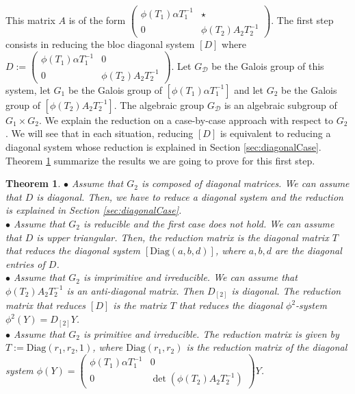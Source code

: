 \documentclass[a4paper,11pt]{amsart}
\newcommand{\Gdiag}{G_{\mathcal{D}}}
\newtheorem{thm}{Theorem}[section]
\begin{document}
This matrix  $A$ is of the form
$\begin{pmatrix}
\phi(T_1)\alpha T_1^{-1}&\star \\ 
0 &\phi(T_2)A_2 T_2^{-1}
\end{pmatrix}$. 
The first step consists in reducing the bloc diagonal system $[D]$ where $D:=\begin{pmatrix}
\phi(T_1)\alpha T_1^{-1}&0 \\ 
0 &\phi(T_2)A_2 T_2^{-1}
\end{pmatrix}$. Let $\Gdiag$ be the Galois group of this system, let $G_1$ be the Galois group of $[\phi(T_1)\alpha T_1^{-1}]$ and let $G_2$ be the Galois group of $[\phi(T_2)A_2 T_2^{-1}]$.  
The algebraic group $\Gdiag$ is an algebraic subgroup of $G_1\times G_2$. We explain the reduction on a case-by-case approach with respect to $G_2$. We will see that in each situation, reducing $[D]$ is equivalent to reducing a diagonal system whose reduction is explained in Section \ref{sec:diagonalCase}. Theorem \ref{thm:reduc_blocdiag} summarize the results we are going to prove for this first step.

  \begin{thm}
  \label{thm:reduc_blocdiag}
$\bullet$ Assume that $G_2$ is composed of diagonal matrices.  We can assume that $D$ is diagonal.  Then, we have to reduce a diagonal system and the reduction is explained in Section \ref{sec:diagonalCase}.\\
$\bullet$  Assume that $G_2$ is reducible and the first case does not hold.  We can assume that $D$ is upper triangular.  Then,   the reduction matrix is the diagonal matrix $T$ that reduces the diagonal  system $[\mathrm{Diag}(a,b,d)]$, where $a,b,d$ are the diagonal entries of $D$.  \\
$\bullet$ Assume that $G_2$ is imprimitive and irreducible.  We can assume that $\phi(T_2)A_2 T_2^{-1}$ is an anti-diagonal matrix.  Then $D_{[2]}$ is diagonal.  The reduction matrix that reduces $[D]$ is the matrix $T$ that reduces the diagonal  $\phi^{2}$-system $\phi^2 (Y)=D_{[2]}Y$. \\
$\bullet$ Assume that $G_2$ is primitive and irreducible. The reduction matrix is given by  $T:=\mathrm{Diag}(r_1,r_2,1)$, where  $\mathrm{Diag}(r_1,r_2)$ is the reduction matrix of the diagonal system $\phi (Y)=\begin{pmatrix}
\phi(T_1)\alpha T_1^{-1}&0\\ 
0 &\det(\phi(T_2)A_2 T_2^{-1})
\end{pmatrix}Y$.  
  \end{thm}
\end{document}
